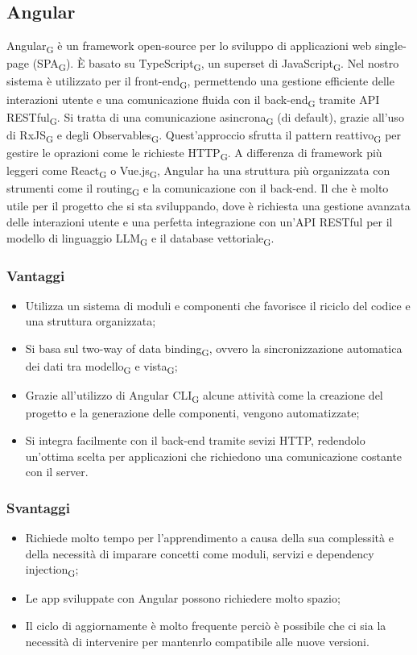 \subsection{Angular}
Angular\textsubscript{G} è un framework open-source per lo sviluppo di applicazioni web single-page (SPA\textsubscript{G}). È basato su TypeScript\textsubscript{G}, un superset di JavaScript\textsubscript{G}. Nel nostro sistema è utilizzato per il front-end\textsubscript{G}, permettendo una gestione efficiente delle interazioni utente e una comunicazione fluida con il back-end\textsubscript{G} tramite API RESTful\textsubscript{G}. Si tratta di una comunicazione asincrona\textsubscript{G} (di default), grazie all'uso di RxJS\textsubscript{G} e degli Observables\textsubscript{G}. Quest'approccio sfrutta il pattern reattivo\textsubscript{G} per gestire le oprazioni come le richieste HTTP\textsubscript{G}. A differenza di framework più leggeri come React\textsubscript{G} o Vue.js\textsubscript{G}, Angular ha una struttura più organizzata con strumenti come il routing\textsubscript{G} e la comunicazione con il back-end. Il che è molto utile per il progetto che si sta sviluppando, dove è richiesta una gestione avanzata delle interazioni utente e una perfetta integrazione con un'API RESTful per il modello di linguaggio LLM\textsubscript{G} e il database vettoriale\textsubscript{G}.
\subsubsection{Vantaggi}
\begin{itemize}
    \item Utilizza un sistema di moduli e componenti che favorisce il riciclo del codice e una struttura organizzata;
    \item Si basa sul two-way of data binding\textsubscript{G}, ovvero la sincronizzazione automatica dei dati tra modello\textsubscript{G} e vista\textsubscript{G};
    \item Grazie all'utilizzo di Angular CLI\textsubscript{G} alcune attività come la creazione del progetto e la generazione delle componenti, vengono automatizzate;
    \item Si integra facilmente con il back-end tramite sevizi HTTP, redendolo un'ottima scelta per applicazioni che richiedono una comunicazione costante con il server.
\end{itemize}
\subsubsection{Svantaggi}
\begin{itemize}
    \item Richiede molto tempo per l'apprendimento a causa della sua complessità e della necessità di imparare concetti come moduli, servizi e dependency injection\textsubscript{G};
    \item Le app sviluppate con Angular possono richiedere molto spazio;
    \item Il ciclo di aggiornamente è molto frequente perciò è possibile che ci sia la necessità di intervenire per mantenrlo compatibile alle nuove versioni.
\end{itemize}

